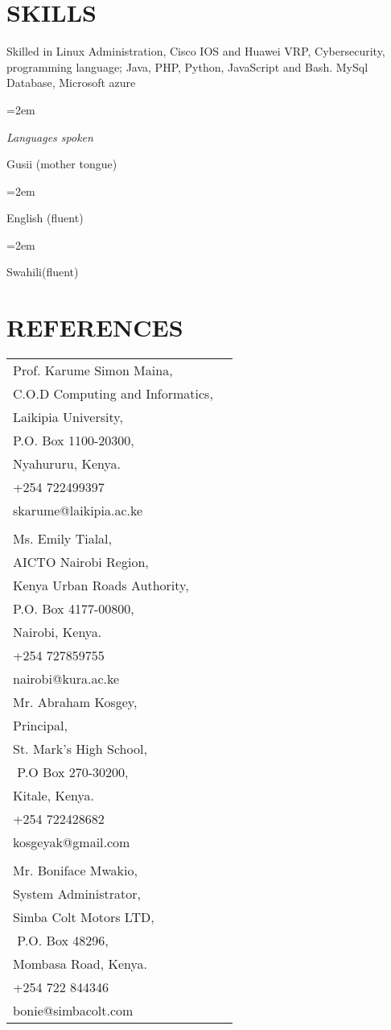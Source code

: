 \documentclass[paper=a4,fontsize=11pt]{scrartcl} %
\newlength{\spacebox}
\newcommand{\sepspace}{\vspace*{1em}}		%
\newcommand{\NewPart}[1]{\section*{\uppercase{#1}}}
\newcommand{\PersonalEntry}[2]{
		\noindent\hangindent=2em\hangafter=0 %
		\parbox{\spacebox}{        %
		\textit{#1}}		       %
		\hspace{1.5em} #2 \par}    %
\newcommand{\SkillsEntry}[2]{      %
		\noindent\hangindent=2em\hangafter=0 %
		\parbox{\spacebox}{        %
		\textit{#1}}			   %
		\hspace{1.5em} #2 \par}    %
\begin{document}
\NewPart{Skills}{Skilled in Linux Administration, Cisco IOS and Huawei VRP, Cybersecurity, programming language; Java, PHP, Python, JavaScript and Bash. MySql Database, Microsoft azure}

\sepspace

\SkillsEntry{Languages spoken}{Gusii (mother tongue)}
\SkillsEntry{}{English (fluent)}
\SkillsEntry{}{Swahili(fluent)}



\NewPart{References}{
\begin{tabular}{ll}
Prof. Karume Simon Maina​,\\
C.O.D Computing and Informatics,\\
Laikipia University,\\
P.O. Box 1100-20300,\\
Nyahururu, Kenya.\\
+254 722499397\\
skarume@laikipia.ac.ke\\ & 
\\Ms. Emily Tialal,\\
AICTO Nairobi Region,\\
Kenya Urban Roads Authority, ​\\
P.O. Box 4177-00800,\\
Nairobi, Kenya.\\
+254 727859755\\
nairobi@kura.ac.ke\\ 

Mr. Abraham Kosgey​,\\
Principal,\\
St. Mark's High School,\\ ​
P.O Box 270-30200,\\
Kitale, Kenya.\\
+254 722428682\\
kosgeyak@gmail.com\\&

\\Mr. Boniface Mwakio​,\\
System Administrator,\\
Simba Colt Motors LTD,\\ ​
P.O. Box 48296,\\
Mombasa Road, Kenya.\\
+254 722 844346\\
bonie@simbacolt.com\\




\end{tabular}
}
\end{document}

